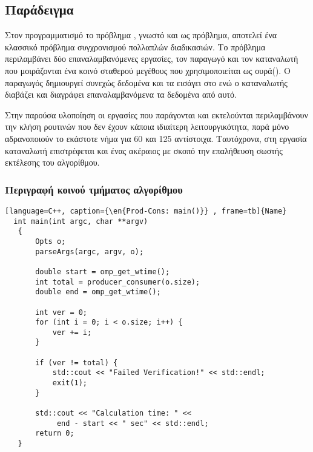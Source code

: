 \subsection{Παράδειγμα }
Στον προγραμματισμό το πρόβλημα \emph{}, γνωστό και ως \emph{} πρόβλημα, αποτελεί ένα κλασσικό πρόβλημα συγχρονισμού πολλαπλών διαδικασιών. Το πρόβλημα περιλαμβάνει δύο επαναλαμβανόμενες εργασίες, τον παραγωγό και τον καταναλωτή που μοιράζονται ένα κοινό \emph{} σταθερού μεγέθους που χρησιμοποιείται ως ουρά(). Ο παραγωγός δημιουργεί συνεχώς δεδομένα και τα εισάγει στο \emph{} ενώ ο καταναλωτής διαβάζει και διαγράφει επαναλαμβανόμενα τα δεδομένα από αυτό.\cite{wiki_prod_cons}

Στην παρούσα υλοποίηση οι εργασίες που παράγονται και εκτελούνται περιλαμβάνουν την κλήση ρουτινών που δεν έχουν κάποια ιδιαίτερη λειτουργικότητα, παρά μόνο αδρανοποιούν το εκάστοτε νήμα για 60 και 125 \emph{} αντίστοιχα. Ταυτόχρονα, στη εργασία καταναλωτή επιστρέφεται και ένας ακέραιος με σκοπό την επαλήθευση σωστής εκτέλεσης του αλγορίθμου.

\subsubsection{Περιγραφή κοινού τμήματος αλγορίθμου }
\begin{spacing}{0.8}
\begin{lstlisting}[language=C++, caption={\en{Prod-Cons: main()}} , frame=tb]{Name}
  int main(int argc, char **argv)
   {
       Opts o;
       parseArgs(argc, argv, o);

       double start = omp_get_wtime();
       int total = producer_consumer(o.size);
       double end = omp_get_wtime();

       int ver = 0;
       for (int i = 0; i < o.size; i++) {
           ver += i;
       }

       if (ver != total) {
           std::cout << "Failed Verification!" << std::endl;
           exit(1);
       }

       std::cout << "Calculation time: " <<
       		end - start << " sec" << std::endl;
       return 0;
   }

\end{lstlisting}
\end{spacing}
\clearpage

